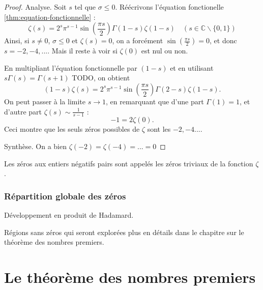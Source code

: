 \documentclass[french]{report}
\begin{document}
\begin{proof}
  Analyse. Soit $s$ tel que $\sigma\leq0$. Réécrivons l'équation fonctionelle \ref{thm:equation-fonctionnelle} :
  \[ \zeta(s) = 2^s\pi^{s-1}\sin\left(\frac{\pi s}{2}\right)\Gamma(1-s)\zeta(1-s)\quad (s\in\mathbb{C}\backslash\{0,1\}) \]
  Ainsi, si $s\neq0$, $\sigma\leq0$ et $\zeta(s)=0$, on a forcément $\sin(\frac{\pi s}{2})=0$, et donc $s=-2,-4,...$. Mais il reste à voir si $\zeta(0)$ est nul ou non.

  En multipliant l'équation fonctionnelle par $(1-s)$ et en utilisant $s\Gamma(s)=\Gamma(s+1)$ TODO, on obtient
  \[ (1-s)\zeta(s) = 2^s\pi^{s-1}\sin\left(\frac{\pi s}{2}\right)\Gamma(2-s)\zeta(1-s). \]
  On peut passer à la limite $s\to1$, en remarquant que d'une part $\Gamma(1)=1$, et d'autre part $\zeta(s)\sim\frac{1}{s-1}$ :
  \[ -1 = 2\zeta(0). \]
  Ceci montre que les seuls zéros possibles de $\zeta$ sont les $-2, -4...$.

  Synthèse. On a bien $\zeta(-2)=\zeta(-4)=...=0$
\end{proof}

Les zéros aux entiers négatifs pairs sont appelés les zéros triviaux de la fonction $\zeta$.

\subsection{Répartition globale des zéros}

Développement en produit de Hadamard.

Régions sans zéros qui seront explorées plus en détails dans le chapitre sur le théorème des nombres premiers.

\chapter{Le théorème des nombres premiers}
\end{document}
